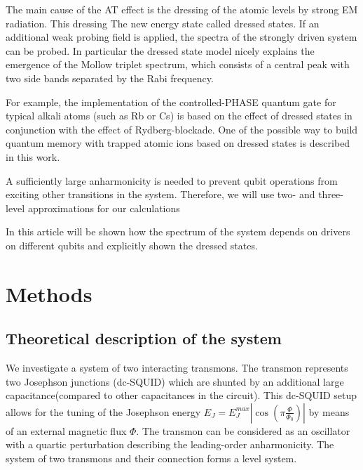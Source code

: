 \documentclass[%
 aip,
 amsmath,amssymb,
 reprint,%
]{revtex4-1}
\begin{document}
The main cause of the AT effect is the dressing of the atomic levels by strong EM radiation. This dressing The new energy state called dressed states. If an additional weak probing field is applied, the spectra of the strongly driven system can be probed. In particular the dressed state model nicely explains the emergence of the Mollow triplet\cite{newstein1968spontaneous} spectrum, which consists of a central peak with two side bands separated by the Rabi frequency.

For example, the implementation of the controlled-PHASE quantum gate for typical alkali atoms (such as Rb or Cs)  is based on the effect of dressed states in conjunction with the effect of Rydberg-blockade\cite{sun2018analysis}. One of the possible way to build quantum memory with trapped atomic ions based on dressed states is described in this work\cite{timoney2011quantum}. 

A sufficiently large anharmonicity is needed to prevent qubit operations from exciting other transitions in the system. Therefore, we will use two- and three-level approximations for our calculations


In this article will be shown how the spectrum of the system depends on drivers on different qubits and explicitly shown the dressed states.%
 
\section{Methods}
\subsection{Theoretical description of the system}

We investigate a system of two interacting transmons. The transmon\cite{koch2007charge} represents two Josephson junctions (dc-SQUID) which are shunted by an additional large capacitance(compared to other capacitances in the circuit). This dc-SQUID setup allows for the tuning of the Josephson energy $E_J = E_J^{max}|\cos(\pi \frac{\Phi}{\Phi_0})|$  by
means of an external magnetic flux $\Phi$. The transmon can be considered as an oscillator with a quartic perturbation describing the leading-order anharmonicity. The system of two transmons and their connection forms a level system.
\end{document}
